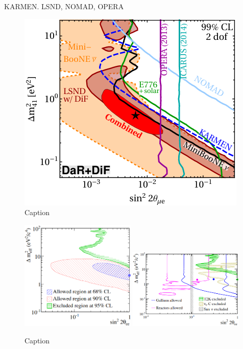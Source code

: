 \nue KARMEN. LSND, NOMAD, OPERA

\begin{figure}
    \centering
    \includegraphics[width = \largefigwidth]{figures-chap6/external_limits/nue_app_combo.png}
    \caption{Caption}
    \label{fig:my_label}
\end{figure}

\begin{figure}
    \centering
    \includegraphics[width = 0.49\textwidth, height = 0.35\textwidth]{figures-chap6/external_limits/nue_disapp_external_T2K.png}
    \includegraphics[width = 0.49\textwidth, height = 0.35\textwidth]{figures-chap6/external_limits/nue_dissap_external_combo.png}
    \caption{Caption}
    \label{fig:my_label}
\end{figure}

